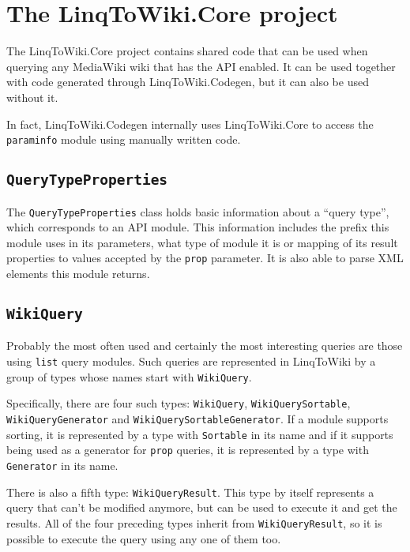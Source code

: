 \section{The LinqToWiki.Core project}

The LinqToWiki.Core project contains shared code that can be used when querying any MediaWiki wiki
that has the API enabled.
It can be used together with code generated through LinqToWiki\allowbreak{}.Codegen,
but it can also be used without it.

In fact, LinqToWiki.\allowbreak{}Codegen internally uses LinqToWiki.Core to access the \texttt{paraminfo} module
using manually written code.

\subsection{\texorpdfstring{\lstinline{QueryTypeProperties}}{QueryTypeProperties}}

The \lstinline{QueryTypeProperties} class holds basic information about a “query type”,
which corresponds to an API module.
This information includes the prefix this module uses in its parameters,
what type of module it is or mapping of its result properties to values accepted by the \texttt{prop} parameter.
It is also able to parse XML elements this module returns.

\subsection{\texorpdfstring{\lstinline{WikiQuery}}{WikiQuery}}

Probably the most often used and certainly the most interesting queries are those using \texttt{list} query modules.
Such queries are represented in LinqToWiki by a group of types whose names start with \lstinline{WikiQuery}.

Specifically, there are four such types:
\lstinline{WikiQuery}, \lstinline{WikiQuerySortable}, \lstinline{Wiki}\lstBreak\lstinline{Query}\lstBreak\lstinline{Generator} and \lstinline{WikiQuerySortableGenerator}.
If a module supports sorting, it is represented by a type with \lstinline{Sortable} in its name
and if it supports being used as a generator for \texttt{prop} queries, it is represented by a type with \lstinline{Generator} in its name.

There is also a fifth type: \lstinline{WikiQueryResult}.
This type by itself represents a query that can't be modified anymore,
but can be used to execute it and get the results.
All of the four preceding types inherit from \lstinline{WikiQueryResult},
so it is possible  to execute the query using any one of them too.

